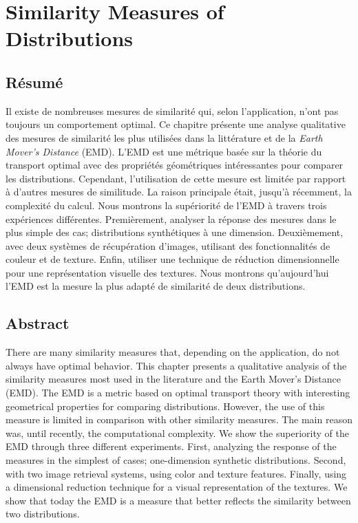 
\chapter{Similarity Measures of Distributions}\label{ch:similarity_measures}


\section*{Résumé}
\noindent Il existe de nombreuses mesures de similarité qui, selon l'application, n'ont pas toujours un comportement optimal. Ce chapitre présente une analyse qualitative des mesures de similarité les plus utilisées dans la littérature et de la \textit{Earth Mover's Distance} (EMD). L'EMD est une métrique basée sur la théorie du transport optimal avec des propriétés géométriques intéressantes pour comparer les distributions. Cependant, l'utilisation de cette mesure est limitée par rapport à d'autres mesures de similitude. La raison principale était, jusqu'à récemment, la complexité du calcul. Nous montrons la supériorité de l'EMD à travers trois expériences différentes. Premièrement, analyser la réponse des mesures dans le plus simple des cas; distributions synthétiques à une dimension. Deuxièmement, avec deux systèmes de récupération d'images, utilisant des fonctionnalités de couleur et de texture. Enfin, utiliser une technique de réduction dimensionnelle pour une représentation visuelle des textures. Nous montrons qu'aujourd'hui l'EMD est la mesure la plus adapté de similarité de deux distributions.

\section*{Abstract}
\noindent There are many similarity measures that, depending on the application, do not always have optimal behavior. This chapter presents a qualitative analysis of the similarity measures most used in the literature and the Earth Mover's Distance (EMD). The EMD is a metric based on optimal transport theory with interesting geometrical properties for comparing distributions. However, the use of this measure is limited in comparison with other similarity measures. The main reason was, until recently, the computational complexity. We show the superiority of the EMD through three different experiments. First, analyzing the response of the measures in the simplest of cases; one-dimension synthetic distributions. Second, with two image retrieval systems, using color and texture features. Finally, using a dimensional reduction technique for a visual representation of the textures. We show that today the EMD is a measure that better reflects the similarity between two distributions.


